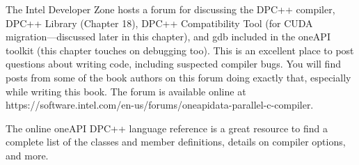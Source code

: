 The Intel Developer Zone hosts a forum for discussing the DPC++ compiler, DPC++ Library (Chapter 18), DPC++ Compatibility Tool (for CUDA migration—discussed later in this chapter), and gdb included in the oneAPI toolkit (this chapter touches on debugging too). This is an excellent place to post questions about writing code, including suspected compiler bugs. You will find posts from some of the book authors on this forum doing exactly that, especially while writing this book. The forum is available online at https://software.intel.com/en-us/forums/oneapidata-parallel-c-compiler.\par

The online oneAPI DPC++ language reference is a great resource to find a complete list of the classes and member definitions, details on compiler options, and more.\par